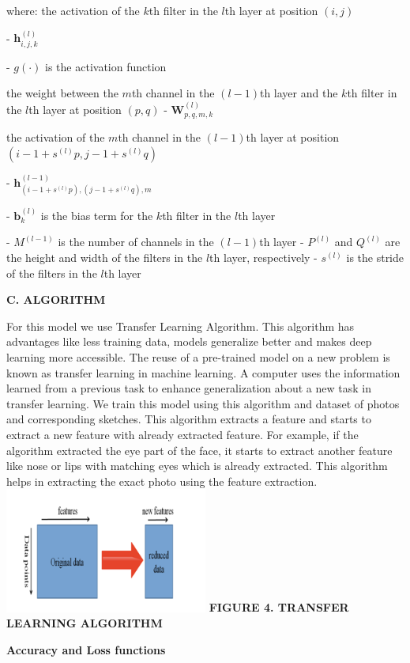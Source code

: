 \documentclass[journal]{IEEEtran} %
\begin{document}
where:
the activation of the $k$th filter in the $l$th layer at position $(i,j)$

- $\mathbf{h}^{(l)}_{i,j,k}$

- $g(\cdot)$ is the activation function

the weight between the $m$th channel in the $(l-1)$th layer and the $k$th filter in the $l$th layer at position $(p,q)$
- $\mathbf{W}^{(l)}_{p,q,m,k}$ 

 the activation of the $m$th channel in the $(l-1)$th layer at position $(i-1+s^{(l)}p,j-1+s^{(l)}q)$
 
- $\mathbf{h}^{(l-1)}_{(i-1+s^{(l)}p),(j-1+s^{(l)}q),m}$  

- $\mathbf{b}^{(l)}_{k}$ is the bias term for the $k$th filter in the $l$th layer

- $M^{(l-1)}$ is the number of channels in the $(l-1)$th layer
- $P^{(l)}$ and $Q^{(l)}$ are the height and width of the filters in the $l$th layer, respectively
- $s^{(l)}$ is the stride of the filters in the $l$th layer

\textbf{C. ALGORITHM}

For this model we use Transfer Learning Algorithm. This algorithm has advantages like less training data, models generalize better and makes deep learning more accessible. The reuse of a pre-trained model on a new problem is known as transfer learning in machine learning. A computer uses the information learned from a previous task to enhance generalization about a new task in transfer learning. We train this model using this algorithm and dataset of photos and corresponding sketches. This algorithm extracts a feature and starts to extract a new feature with already extracted feature. For example, if the algorithm extracted the eye part of the face, it starts to extract another feature like nose or lips with matching eyes which is already extracted. This algorithm helps in extracting the exact photo using the feature extraction.
\includegraphics[width=0.5\textwidth]{alg.png}
\textbf{{\textbf{FIGURE 4. TRANSFER LEARNING ALGORITHM}}
}

\textbf{Accuracy and Loss functions}
\end{document}
